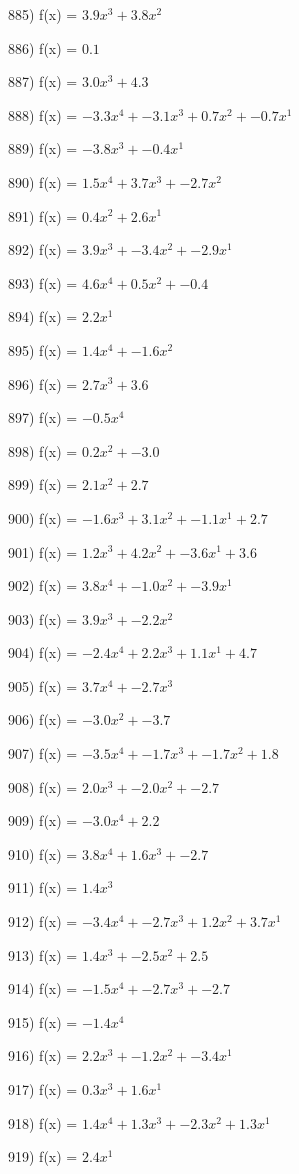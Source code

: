 \documentclass[10pt,a4paper]{article}
\begin{document}
885) f(x) = $3.9x^3 + 3.8x^2$

886) f(x) = $0.1$

887) f(x) = $3.0x^3 + 4.3$

888) f(x) = $-3.3x^4 + -3.1x^3 + 0.7x^2 + -0.7x^1$

889) f(x) = $-3.8x^3 + -0.4x^1$

890) f(x) = $1.5x^4 + 3.7x^3 + -2.7x^2$

891) f(x) = $0.4x^2 + 2.6x^1$

892) f(x) = $3.9x^3 + -3.4x^2 + -2.9x^1$

893) f(x) = $4.6x^4 + 0.5x^2 + -0.4$

894) f(x) = $2.2x^1$

895) f(x) = $1.4x^4 + -1.6x^2$

896) f(x) = $2.7x^3 + 3.6$

897) f(x) = $-0.5x^4$

898) f(x) = $0.2x^2 + -3.0$

899) f(x) = $2.1x^2 + 2.7$

900) f(x) = $-1.6x^3 + 3.1x^2 + -1.1x^1 + 2.7$

901) f(x) = $1.2x^3 + 4.2x^2 + -3.6x^1 + 3.6$

902) f(x) = $3.8x^4 + -1.0x^2 + -3.9x^1$

903) f(x) = $3.9x^3 + -2.2x^2$

904) f(x) = $-2.4x^4 + 2.2x^3 + 1.1x^1 + 4.7$

905) f(x) = $3.7x^4 + -2.7x^3$

906) f(x) = $-3.0x^2 + -3.7$

907) f(x) = $-3.5x^4 + -1.7x^3 + -1.7x^2 + 1.8$

908) f(x) = $2.0x^3 + -2.0x^2 + -2.7$

909) f(x) = $-3.0x^4 + 2.2$

910) f(x) = $3.8x^4 + 1.6x^3 + -2.7$

911) f(x) = $1.4x^3$

912) f(x) = $-3.4x^4 + -2.7x^3 + 1.2x^2 + 3.7x^1$

913) f(x) = $1.4x^3 + -2.5x^2 + 2.5$

914) f(x) = $-1.5x^4 + -2.7x^3 + -2.7$

915) f(x) = $-1.4x^4$

916) f(x) = $2.2x^3 + -1.2x^2 + -3.4x^1$

917) f(x) = $0.3x^3 + 1.6x^1$

918) f(x) = $1.4x^4 + 1.3x^3 + -2.3x^2 + 1.3x^1$

919) f(x) = $2.4x^1$
\end{document}
